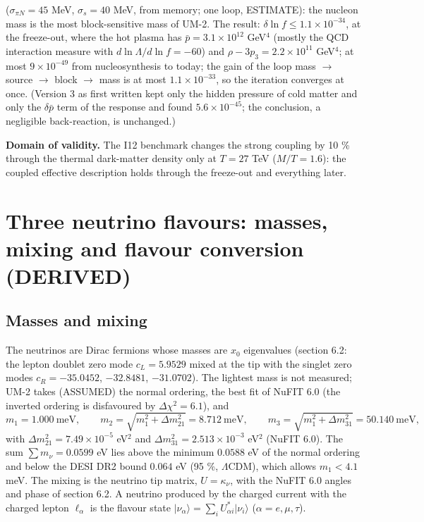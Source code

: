 \documentclass[
  10pt,
]{article}
\begin{document}
(\(\sigma_{\pi N} = 45\) MeV, \(\sigma_s = 40\) MeV, from memory; one
loop, ESTIMATE): the nucleon mass is the most block-sensitive mass of
UM-2. The result: \(\delta\ln f \le 1.1\times10^{-34}\), at the
freeze-out, where the hot plasma has \(\bar p = 3.1\times10^{12}\)
GeV\(^4\) (mostly the QCD interaction measure with
\(d\ln\Lambda/d\ln f = -60\)) and \(\rho - 3p_3 = 2.2\times10^{11}\)
GeV\(^4\); at most \(9\times10^{-49}\) from nucleosynthesis to today;
the gain of the loop mass \(\to\) source \(\to\) block \(\to\) mass is
at most \(1.1\times10^{-33}\), so the iteration converges at once.
(Version 3 as first written kept only the hidden pressure of cold matter
and only the \(\delta\bar p\) term of the response and found
\(5.6\times10^{-45}\); the conclusion, a negligible back-reaction, is
unchanged.)

\textbf{Domain of validity.} The I12 benchmark changes the strong
coupling by 10 \% through the thermal dark-matter density only at
\(T = 27\) TeV (\(M/T = 1.6\)): the coupled effective description holds
through the freeze-out and everything later.

\hypertarget{three-neutrino-flavours-masses-mixing-and-flavour-conversion-derived}{%
\section{Three neutrino flavours: masses, mixing and flavour conversion
(DERIVED)}\label{three-neutrino-flavours-masses-mixing-and-flavour-conversion-derived}}

\hypertarget{masses-and-mixing}{%
\subsection{Masses and mixing}\label{masses-and-mixing}}

The neutrinos are Dirac fermions whose masses are \(x_0\) eigenvalues
(section 6.2: the lepton doublet zero mode \(c_L = 5.9529\) mixed at the
tip with the singlet zero modes \(c_R = -35.0452\), \(-32.8481\),
\(-31.0702\)). The lightest mass is not measured; UM-2 takes (ASSUMED)
the normal ordering, the best fit of NuFIT 6.0 (the inverted ordering is
disfavoured by \(\Delta\chi^2 = 6.1\)), and
\[ m_1 = 1.000\ \text{meV},\qquad m_2 = \sqrt{m_1^2 + \Delta m^2_{21}} = 8.712\ \text{meV},\qquad m_3 = \sqrt{m_1^2 + \Delta m^2_{31}} = 50.140\ \text{meV}, \]
with \(\Delta m^2_{21} = 7.49\times10^{-5}\) eV\(^2\) and
\(\Delta m^2_{31} = 2.513\times10^{-3}\) eV\(^2\) (NuFIT 6.0). The sum
\(\sum m_\nu = 0.0599\) eV lies above the minimum \(0.0588\) eV of the
normal ordering and below the DESI DR2 bound \(0.064\) eV (95 \%,
\(\Lambda\)CDM), which allows \(m_1 < 4.1\) meV. The mixing is the
neutrino tip matrix, \(U = \kappa_\nu\), with the NuFIT 6.0 angles and
phase of section 6.2. A neutrino produced by the charged current with
the charged lepton \(\ell_\alpha\) is the flavour state
\(\lvert\nu_\alpha\rangle = \sum_iU^*_{\alpha i}\lvert\nu_i\rangle\)
(\(\alpha = e, \mu, \tau\)).
\end{document}
